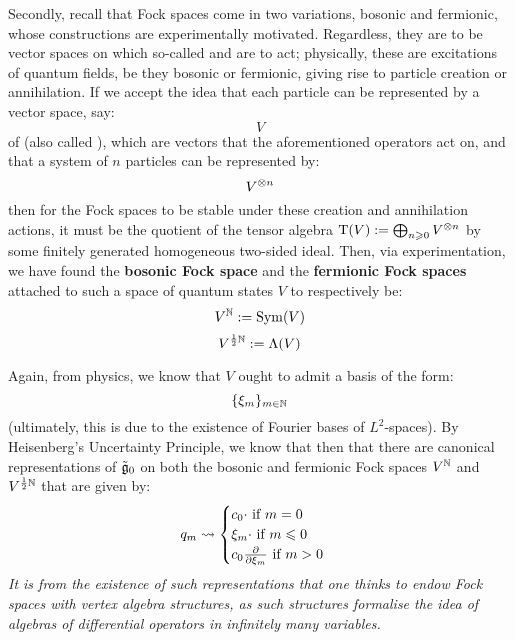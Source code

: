             Secondly, recall that Fock spaces come in two variations, bosonic and fermionic, whose constructions are experimentally motivated. Regardless, they are to be vector spaces on which so-called  and  are to act; physically, these are excitations of quantum fields, be they bosonic or fermionic, giving rise to particle creation or annihilation. If we accept the idea that each particle can be represented by a vector space, say:
                $$V$$
            of  (also called ), which are vectors that the aforementioned operators act on, and that a system of $n$ particles can be represented by:
                $$V^{\tensor n}$$
            then for the Fock spaces to be stable under these creation and annihilation actions, it must be the quotient of the tensor algebra $\rmT(V) := \bigoplus_{n \geq 0} V^{\tensor n}$ by some finitely generated homogeneous two-sided ideal. Then, via experimentation, we have found the \textbf{bosonic Fock space} and the \textbf{fermionic Fock spaces} attached to such a space of quantum states $V$ to respectively be:
                $$V^{\mathbb{N}} := \mathrm{Sym}(V)$$
                $$V^{\frac12 \mathbb{N}} := \Lambda(V)$$

            Again, from physics, we know that $V$ ought to admit a basis of the form:
                $$\{\xi_m\}_{m \in \mathbb{N}}$$
            (ultimately, this is due to the existence of Fourier bases of $L^2$-spaces). By Heisenberg's Uncertainty Principle, we know that then that there are canonical representations of $\tilde{\mathfrak{g}}_0$ on both the bosonic and fermionic Fock spaces $V^{\mathbb{N}}$ and $V^{\frac12 \mathbb{N}}$ that are given by:
                $$
                    q_m \leadsto
                    \begin{cases}
                        \text{$c_0 \cdot$ if $m = 0$}
                        \\
                        \text{$\xi_m \cdot$ if $m \leqslant 0$}
                        \\
                        \text{$c_0 \frac{\partial}{\partial \xi_m}$ if $m > 0$}
                    \end{cases}
                $$
            \textit{It is from the existence of such representations that one thinks to endow Fock spaces with vertex algebra structures, as such structures formalise the idea of algebras of differential operators in infinitely many variables.} 


